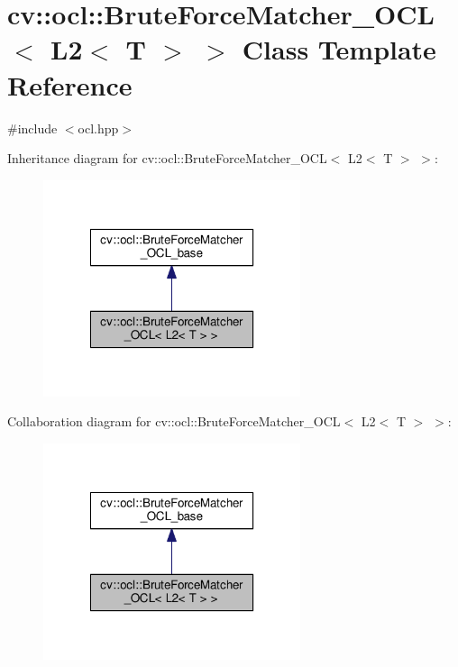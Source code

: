 \hypertarget{classcv_1_1ocl_1_1BruteForceMatcher__OCL_3_01L2_3_01T_01_4_01_4}{\section{cv\-:\-:ocl\-:\-:Brute\-Force\-Matcher\-\_\-\-O\-C\-L$<$ L2$<$ T $>$ $>$ Class Template Reference}
\label{classcv_1_1ocl_1_1BruteForceMatcher__OCL_3_01L2_3_01T_01_4_01_4}
}


{\ttfamily \#include $<$ocl.\-hpp$>$}



Inheritance diagram for cv\-:\-:ocl\-:\-:Brute\-Force\-Matcher\-\_\-\-O\-C\-L$<$ L2$<$ T $>$ $>$\-:\nopagebreak
\begin{figure}[H]
\begin{center}
\leavevmode
\includegraphics[width=214pt]{classcv_1_1ocl_1_1BruteForceMatcher__OCL_3_01L2_3_01T_01_4_01_4__inherit__graph}
\end{center}
\end{figure}


Collaboration diagram for cv\-:\-:ocl\-:\-:Brute\-Force\-Matcher\-\_\-\-O\-C\-L$<$ L2$<$ T $>$ $>$\-:\nopagebreak
\begin{figure}[H]
\begin{center}
\leavevmode
\includegraphics[width=214pt]{classcv_1_1ocl_1_1BruteForceMatcher__OCL_3_01L2_3_01T_01_4_01_4__coll__graph}
\end{center}
\end{figure}
